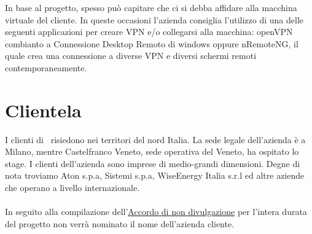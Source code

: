 In base al progetto, spesso può capitare che ci si debba affidare alla macchina virtuale del cliente. In queste occasioni l'azienda consiglia l'utilizzo di una delle seguenti applicazioni per creare VPN e/o collegarsi alla macchina: openVPN combianto a Connessione Desktop Remoto di windows oppure nRemoteNG, il quale crea una connessione a diverse VPN e diversi schermi remoti contemporaneamente. 

\newpage

\section{Clientela}
\label{cap1:Clientela}
I clienti di \azienda\ risiedono nei territori del nord Italia. La sede legale dell'azienda è a Milano, mentre Castelfranco Veneto, sede operativa del Veneto, ha ospitato lo stage. I clienti dell'azienda sono imprese di medio-grandi dimensioni. Degne di nota troviamo Aton s.p.a, Sistemi s.p.a, WiseEnergy Italia s.r.l ed altre aziende che operano a livello internazionale.
\paragraph*{}In seguito alla compilazione dell'\hyperref[NDA]{Accordo di non divulgazione} per l'intera durata del progetto non verrà nominato il nome dell'azienda cliente.